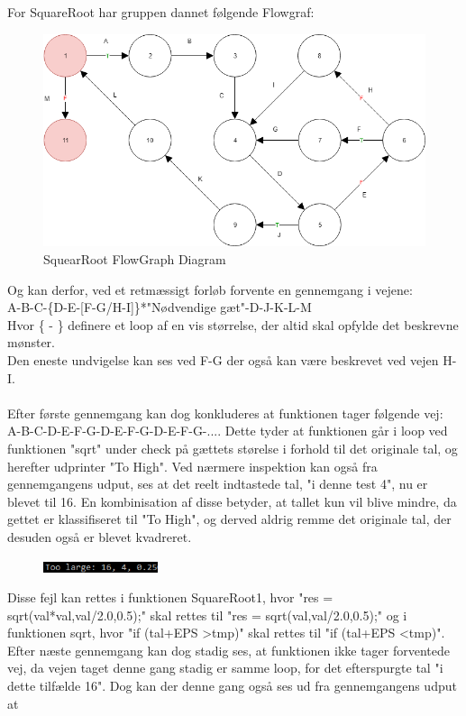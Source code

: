 \documentclass[11pt]{article}
\begin{document}
    \noindent
    For SquareRoot har gruppen dannet følgende Flowgraf:\\
    \begin{figure}[H]
        \centering
        \includegraphics[width=1\textwidth,angle=0]{Struktureret_System_Udvikling/Workshop_3/SquareRoot_FlowGraph.png}
        \caption{SquearRoot FlowGraph Diagram}
        \label{fig:SquearRootGraph}
    \end{figure}
    Og kan derfor, ved et retmæssigt forløb forvente en gennemgang i vejene:\\
    A-B-C-\{D-E-[F-G/H-I]\}*"Nødvendige gæt"-D-J-K-L-M\\
    Hvor \{ - \} definere et loop af en vis størrelse, der altid skal opfylde det beskrevne mønster.\\
    Den eneste undvigelse kan ses ved F-G der også kan være beskrevet ved vejen H-I.\\
    \\
    Efter første gennemgang kan dog konkluderes at funktionen tager følgende vej:\\
    A-B-C-D-E-F-G-D-E-F-G-D-E-F-G-.... Dette tyder at funktionen går i loop ved funktionen "sqrt" under check på gættets størelse i forhold til det originale tal, og herefter udprinter "To High".
    Ved nærmere inspektion kan også fra gennemgangens udput, ses at det reelt indtastede tal, "i denne test 4", nu er blevet til 16. En kombinisation af disse betyder, at tallet kun vil blive mindre, da gettet er klassifiseret til "To High", og derved aldrig remme det originale tal, der desuden også er blevet kvadreret.
    \begin{figure}[H]
        \includegraphics[width=0.3\textwidth,angle=0]{Struktureret_System_Udvikling/Workshop_3/Udklip.PNG}
        \label{fig:Udklip}
    \end{figure}
    \noindent
    Disse fejl kan rettes i funktionen SquareRoot1, hvor "res = sqrt(val*val,val/2.0,0.5);" skal rettes til "res = sqrt(val,val/2.0,0.5);" og i funktionen sqrt, hvor "if (tal+EPS \textgreater tmp)" skal rettes til "if (tal+EPS \textless tmp)".
    Efter næste gennemgang kan dog stadig ses, at funktionen ikke tager forventede vej, da vejen taget denne gang stadig er samme loop, for det efterspurgte tal "i dette tilfælde 16". Dog kan der denne gang også ses ud fra gennemgangens udput at  
    
\end{document}
